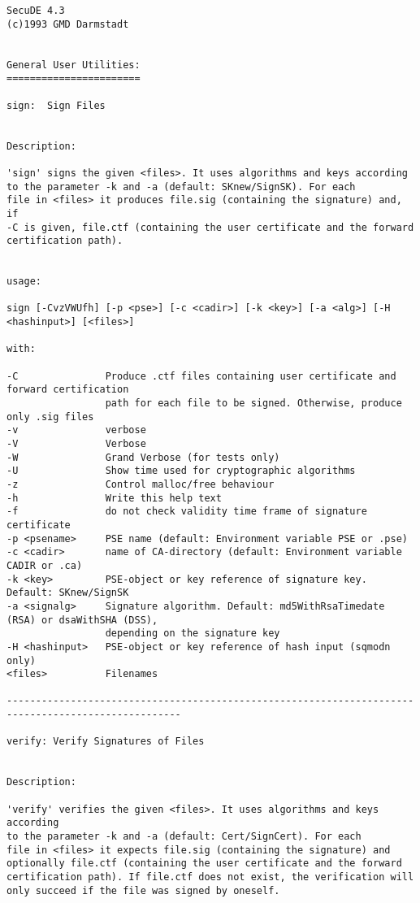 {\scriptsize
\begin{verbatim}
SecuDE 4.3                                                                (c)1993 GMD Darmstadt


General User Utilities:
=======================

sign:  Sign Files


Description:

'sign' signs the given <files>. It uses algorithms and keys according
to the parameter -k and -a (default: SKnew/SignSK). For each
file in <files> it produces file.sig (containing the signature) and, if
-C is given, file.ctf (containing the user certificate and the forward
certification path).


usage:

sign [-CvzVWUfh] [-p <pse>] [-c <cadir>] [-k <key>] [-a <alg>] [-H <hashinput>] [<files>]

with:

-C               Produce .ctf files containing user certificate and forward certification
                 path for each file to be signed. Otherwise, produce only .sig files
-v               verbose
-V               Verbose
-W               Grand Verbose (for tests only)
-U               Show time used for cryptographic algorithms
-z               Control malloc/free behaviour
-h               Write this help text
-f               do not check validity time frame of signature certificate
-p <psename>     PSE name (default: Environment variable PSE or .pse)
-c <cadir>       name of CA-directory (default: Environment variable CADIR or .ca)
-k <key>         PSE-object or key reference of signature key. Default: SKnew/SignSK
-a <signalg>     Signature algorithm. Default: md5WithRsaTimedate (RSA) or dsaWithSHA (DSS),
                 depending on the signature key
-H <hashinput>   PSE-object or key reference of hash input (sqmodn only)
<files>          Filenames

----------------------------------------------------------------------------------------------------

verify: Verify Signatures of Files


Description:

'verify' verifies the given <files>. It uses algorithms and keys according
to the parameter -k and -a (default: Cert/SignCert). For each
file in <files> it expects file.sig (containing the signature) and
optionally file.ctf (containing the user certificate and the forward
certification path). If file.ctf does not exist, the verification will
only succeed if the file was signed by oneself.



\end{verbatim}}
